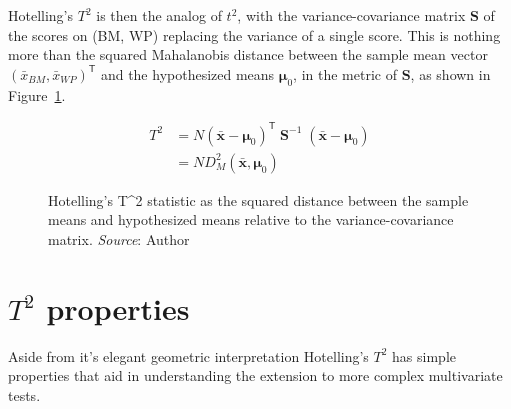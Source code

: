 \documentclass[
  letterpaper,
  10pt,
  krantz2]{krantz}
\begin{document}
{Hotelling's \(T^2\) is then the analog of \(t^2\), with the
variance-covariance matrix \(\mathbf{S}\) of the scores on (BM, WP)
replacing the variance of a single score. This is nothing more than the
squared Mahalanobis distance between the sample mean vector
\((\bar{x}_{BM}, \bar{x}_{WP})^\textsf{T}\) and the hypothesized means
\(\mathbf{\mu}_0\), in the metric of \(\mathbf{S}\), as shown in
Figure~\ref{fig-T2-diagram}.

\begin{align*}
T^2 &= N (\bar{\mathbf{x}} - \mathbf{\mu}_0)^\textsf{T} \; \mathbf{S}^{-1} \; (\bar{\mathbf{x}} - \mathbf{\mu}_0) \\
    &= N D^2_M (\bar{\mathbf{x}}, \mathbf{\mu}_0)
\end{align*}

\begin{figure}


\caption{\label{fig-T2-diagram}Hotelling's T\^{}2 statistic as the
squared distance between the sample means and hypothesized means
relative to the variance-covariance matrix. \emph{Source}: Author}

\end{figure}%

\section{\texorpdfstring{\(T^2\)
properties}{T\^{}2 properties}}\label{t2-properties}

Aside from it's elegant geometric interpretation Hotelling's \(T^2\) has
simple properties that aid in understanding the extension to more
complex multivariate tests.

}
\end{document}
